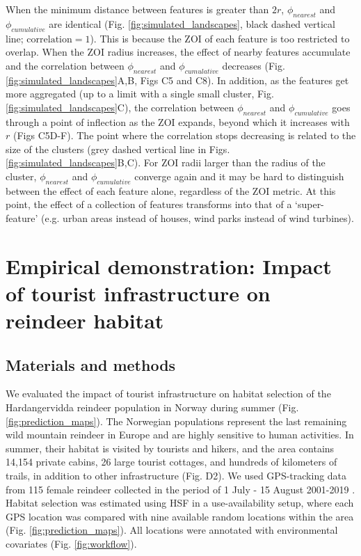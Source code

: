\documentclass[titlepage]{article}
\begin{document}
When the minimum distance between features is greater than $2r$, $\phi_{nearest}$ and $\phi_{cumulative}$ are identical (Fig. \ref{fig:simulated_landscapes}, black dashed vertical line; $\text{correlation} = 1$). This is because the ZOI of each feature is too restricted to overlap. When the ZOI radius increases, the effect of nearby features accumulate and the correlation between $\phi_{nearest}$ and $\phi_{cumulative}$ decreases (Fig. \ref{fig:simulated_landscapes}A,B, Figs C5 and C8). In addition, as the features get more aggregated (up to a limit with a single small cluster, Fig. \ref{fig:simulated_landscapes}C), the correlation between $\phi_{nearest}$ and $\phi_{cumulative}$ goes through a point of inflection as the ZOI expands, beyond which it increases with $r$ (Figs C5D-F). The point where the correlation stops decreasing is related to the size of the clusters (grey dashed vertical line in Figs. \ref{fig:simulated_landscapes}B,C). For ZOI radii larger than the radius of the cluster, $\phi_{nearest}$ and $\phi_{cumulative}$ converge again 
and it may be hard to distinguish between the effect of each feature alone, regardless of the ZOI metric. At this point, the effect of a collection of features transforms into that of a `super-feature' (e.g. urban areas instead of houses, wind parks instead of wind turbines). 

\section{Empirical demonstration: Impact of tourist infrastructure on reindeer habitat}

\subsection{Materials and methods}

We evaluated the impact of tourist infrastructure on habitat selection of the Hardangervidda reindeer population in Norway during summer (Fig. \ref{fig:prediction_maps}). The Norwegian populations represent the last remaining wild mountain reindeer in Europe and are highly sensitive to human activities. In summer, their habitat is visited by tourists and hikers, and the area contains 14,154 private cabins, 26 large tourist cottages, and hundreds of kilometers of trails, in addition to other infrastructure (Fig. D2). We used GPS-tracking data from 115 female reindeer collected in the period of 1 July - 15 August 2001-2019 \citep[see][]{panzacchi_searching_2015}. Habitat selection was estimated using HSF in a use-availability setup, where each GPS location was compared with nine available random locations within the area (Fig. \ref{fig:prediction_maps}). All locations were annotated with environmental covariates (Fig. \ref{fig:workflow}).
\end{document}
